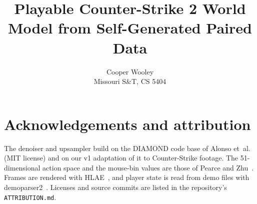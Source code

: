 \documentclass[10pt,twocolumn,letterpaper]{article}
\title{Playable Counter-Strike 2 World Model from Self-Generated Paired Data}
\author{Cooper Wooley\\
Missouri S\&T, CS 5404}
\begin{document}
\maketitle










\section*{Acknowledgements and attribution}
\label{sec:ack}
The denoiser and upsampler build on the DIAMOND code base of Alonso et~al.~\cite{alonso2024diamond}
(MIT license) and on our v1 adaptation of it to Counter-Strike footage. The 51-dimensional action space and the
mouse-bin values are those of Pearce and Zhu~\cite{pearce2021counterstrike}. Frames are rendered with
HLAE~\cite{hlae}, and player state is read from demo files with demoparser2~\cite{demoparser2}. Licenses and
source commits are listed in the repository's \texttt{ATTRIBUTION.md}.


{
  \small
  
  
}
\end{document}

